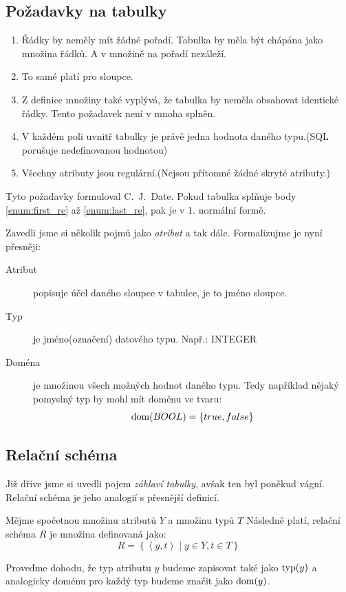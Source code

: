 \subsection{Požadavky na tabulky}
\begin{enumerate}
\item\label{enum:first_re} Řádky by neměly mít žádné pořadí. Tabulka by měla být chápána jako množina řádků. A v množině na pořadí nezáleží.
\item To samé platí pro sloupce.
\item Z definice množiny také vyplývá, že tabulka by neměla obsahovat identické řádky. Tento požadavek není v mnoha  splněn.
\item V každém poli uvnitř tabulky je právě jedna hodnota daného typu.(SQL porušuje nedefinovanou hodnotou)
\item\label{enum:last_re} Všechny atributy jsou regulární.(Nejsou přítomné žádné skryté atributy.)
\end{enumerate}
Tyto požadavky formuloval C.~J.~Date.
Pokud tabulka splňuje body \ref{enum:first_re} až \ref{enum:last_re}, pak je v 1. normální formě.

Zavedli jsme si několik pojmů jako \textit{atribut} a tak dále. Formalizujme je nyní přesněji:
\begin{description}
\item[Atribut] popisuje účel daného sloupce v tabulce, je to jméno sloupce.
\item[Typ] je jméno(označení) datového typu. Např.: INTEGER
\item[Doména] je množinou všech možných hodnot daného typu. Tedy například nějaký pomyslný typ by mohl mít doménu ve tvaru: $$
\operatorname{dom}(BOOL) = \left\{ true, false \right\}
$$
\end{description}

\subsection{Relační schéma}
Již dříve jsme si uvedli pojem \textit{záhlaví tabulky}, avšak ten byl poněkud vágní. Relační schéma je jeho analogií s přesnější definicí.
\begin{uptheorem}
Mějme spočetnou množinu atributů $Y$ a množinu typů $T$ Následně platí, relační schéma $R$ je množina definovaná jako:
$$
R = \left\{ \left\langle y, t \right\rangle \; | \; y \in Y, t \in T \right\}
$$
\end{uptheorem}
Proveďme dohodu, že typ atributu $y$ budeme zapisovat také jako $\operatorname{typ}(y)$ a analogicky doménu pro každý typ budeme značit jako $\operatorname{dom}(y)$.

